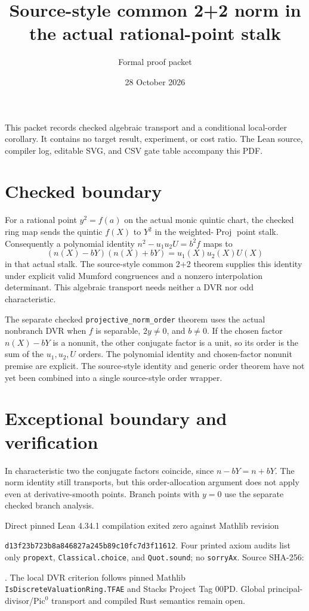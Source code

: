 \documentclass[11pt]{article}
\title{Source-style common 2+2 norm in the actual rational-point stalk}
\author{Formal proof packet}
\date{28 October 2026}
\begin{document}
\maketitle
\noindent This packet records checked algebraic transport and a conditional local-order corollary. It contains no target result, experiment, or cost ratio. The Lean source, compiler log, editable SVG, and CSV gate table accompany this PDF.

\section*{Checked boundary}
For a rational point $y^2=f(a)$ on the actual monic quintic chart, the checked ring map sends the quintic $f(X)$ to $Y^2$ in the weighted-$\operatorname{Proj}$ point stalk. Consequently a polynomial identity $n^2-u_1u_2U=b^2f$ maps to
\[
  (n(X)-bY)(n(X)+bY)=u_1(X)u_2(X)U(X)
\]
in that actual stalk. The source-style common 2+2 theorem supplies this identity under explicit valid Mumford congruences and a nonzero interpolation determinant. This algebraic transport needs neither a DVR nor odd characteristic.

The separate checked \texttt{projective\_norm\_order} theorem uses the actual nonbranch DVR when $f$ is separable, $2y\ne0$, and $b\ne0$. If the chosen factor $n(X)-bY$ is a nonunit, the other conjugate factor is a unit, so its order is the sum of the $u_1,u_2,U$ orders. The polynomial identity and chosen-factor nonunit premise are explicit. The source-style identity and generic order theorem have not yet been combined into a single source-style order wrapper.

\section*{Exceptional boundary and verification}
In characteristic two the conjugate factors coincide, since $n-bY=n+bY$. The norm identity still transports, but this order-allocation argument does not apply even at derivative-smooth points. Branch points with $y=0$ use the separate checked branch analysis.

Direct pinned Lean 4.34.1 compilation exited zero against Mathlib revision
\par\noindent\texttt{d13f23b723b8a846827a245b89c10fc7d3f11612}.
Four printed axiom audits list only \texttt{propext}, \texttt{Classical.choice}, and \texttt{Quot.sound}; no \texttt{sorryAx}. Source SHA-256:
\par{}.
The local DVR criterion follows pinned Mathlib \texttt{IsDiscreteValuationRing.TFAE} and Stacks Project Tag 00PD. Global principal-divisor/$\mathrm{Pic}^0$ transport and compiled Rust semantics remain open.
\end{document}
